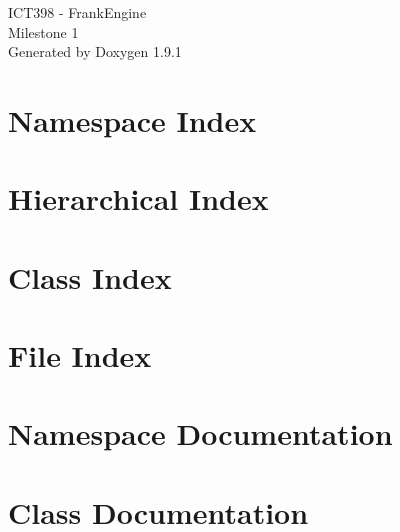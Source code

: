 \let\mypdfximage\pdfximage\def\pdfximage{\immediate\mypdfximage}\documentclass[twoside]{book}
\newcommand{\+}{\discretionary{\mbox{\scriptsize$\hookleftarrow$}}{}{}}
\newcommand{\clearemptydoublepage}{%
  \newpage{\pagestyle{empty}\cleardoublepage}%
}
\begin{document}
\raggedbottom

\hypersetup{pageanchor=false,
             bookmarksnumbered=true,
             pdfencoding=unicode
            }
\begin{titlepage}
\vspace*{7cm}
\begin{center}%
{\Large ICT398 -\/ Frank\+Engine \\[1ex]\large Milestone 1 }\\
\vspace*{1cm}
{\large Generated by Doxygen 1.9.1}\\
\end{center}
\end{titlepage}
\clearemptydoublepage
{}
\tableofcontents
\clearemptydoublepage
{}
\hypersetup{pageanchor=true}

\chapter{Namespace Index}

\chapter{Hierarchical Index}

\chapter{Class Index}

\chapter{File Index}

\chapter{Namespace Documentation}

\chapter{Class Documentation}









































\end{document}
